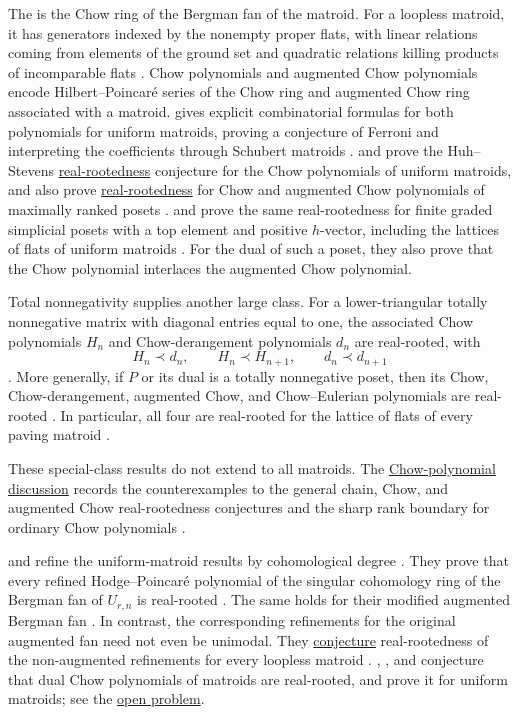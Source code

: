 The  is the Chow ring of the Bergman fan of the
matroid.  For a loopless matroid, it has generators indexed by the nonempty
proper flats, with linear relations coming from elements of the ground set and
quadratic relations killing products of incomparable flats
\cite{AdiprasitoHuhKatz2018}.  Chow polynomials and augmented Chow polynomials
encode Hilbert--Poincaré series of the Chow ring and augmented Chow ring
associated with a matroid.
 gives explicit combinatorial formulas for both
polynomials for uniform matroids, proving a conjecture of Ferroni and
interpreting the coefficients through Schubert matroids \cite{Hoster2024x}.
 and  prove the Huh--Stevens
\hyperref[realRootedPolynomial]{real-rootedness} conjecture for the Chow
polynomials of uniform matroids, and
also prove \hyperref[realRootedPolynomial]{real-rootedness} for Chow and augmented Chow polynomials of
maximally ranked posets \cite{BrandenVecchi2025Uniform}.
 and  prove the same real-rootedness
for finite graded simplicial posets with a top element and positive
$h$-vector, including the lattices of flats of uniform matroids
\cite{HosterStump2025x}.  For the dual of such a poset, they also prove that
the Chow polynomial interlaces the augmented Chow polynomial.

Total nonnegativity supplies another large class.  For a lower-triangular
totally nonnegative matrix with diagonal entries equal to one, the associated
Chow polynomials $H_n$ and Chow-derangement polynomials $d_n$ are real-rooted,
with
\[
 H_n\prec d_n,\qquad H_n\prec H_{n+1},\qquad d_n\prec d_{n+1}
\]
\cite[Thm.~4.18]{BrandenVecchi2025x}.  More generally, if $P$ or its dual is
a totally nonnegative poset, then its Chow, Chow-derangement, augmented Chow,
and Chow--Eulerian polynomials are real-rooted
\cite[Thm.~6.1]{BrandenVecchi2025x}.  In particular, all four are real-rooted
for the lattice of flats of every paving matroid
\cite[Cor.~7.2]{BrandenVecchi2025x}.

These special-class results do not extend to all matroids.  The
\hyperref[realRootsChow]{Chow-polynomial discussion} records the
counterexamples to the general chain, Chow, and augmented Chow
real-rootedness conjectures and the sharp rank boundary for ordinary Chow
polynomials \cite{BercziCoronEurLi2026x}.

 and  refine the uniform-matroid
results by cohomological degree \cite{BinderVecchi2026x}.  They prove that
every refined Hodge--Poincaré polynomial of the singular cohomology ring of
the Bergman fan of \(U_{r,n}\) is real-rooted
\cite[Thm.~1.4]{BinderVecchi2026x}.  The same holds for their modified
augmented Bergman fan \cite[Thm.~1.6]{BinderVecchi2026x}.  In contrast, the
corresponding refinements for the original augmented fan need not even be
unimodal.  They \hyperref[conjRefinedChow]{conjecture} real-rootedness of
the non-augmented refinements for every loopless matroid
\cite[Conj.~1.5]{BinderVecchi2026x}.  ,
, and  conjecture that dual Chow
polynomials of matroids are real-rooted, and prove it for uniform matroids;
see the \hyperref[conjDualChow]{open problem}.


